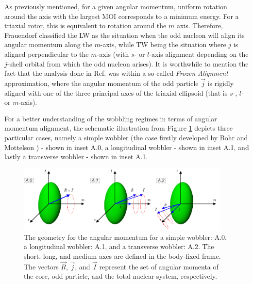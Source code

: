 \documentclass[11pt]{article}
\begin{document}
As previously mentioned, for a given angular momentum, uniform rotation around the axis with the largest MOI corresponds to a minimum energy. For a triaxial rotor, this is equivalent to rotation around the $m$ axis. Therefore, Frauendorf \cite{frauendorf2014transverse} classified the LW as the situation when the odd nucleon will align its angular momentum along the $m$-axis, while TW being the situation where $j$ is aligned perpendicular to the $m$-axis (with $s$- or $l$-axis alignment depending on the $j$-shell orbital from which the odd nucleon arises). It is worthwhile to mention the fact that the analysis done in Ref. \cite{frauendorf2014transverse} was within a so-called \emph{Frozen Alignment} approximation, where the angular momentum of the odd particle $\vec{j}$ is rigidly aligned with one of the three principal axes of the triaxial ellipsoid (that is $s$-, $l$- or $m$-axis).

For a better understanding of the wobbling regimes in terms of angular momentum alignment, the schematic illustration from Figure \ref{wobbling-coupling-scheme} depicts three particular cases, namely a simple wobbler (the case firstly developed by Bohr and Mottelson \cite{bohr1998nuclear}) - shown in inset A.0, a longitudinal wobbler - shown in inset A.1, and lastly a transverse wobbler - shown in inset A.1.

\begin{figure}
    \centering
    \includegraphics[width=0.95\textwidth]{figs/wobbling_Regimes_COUPLING_SCHEME.pdf}
    \caption{The geometry for the angular momentum for a simple wobbler: A.0, a longitudinal wobbler: A.1, and a transverse wobbler: A.2. The short, long, and medium axes are defined in the body-fixed frame. The vectors $\vec{R}$, $\vec{j}$, and $\vec{I}$ represent the set of angular momenta of the core, odd particle, and the total nuclear system, respectively.}
    \label{wobbling-coupling-scheme}
\end{figure}
\end{document}

